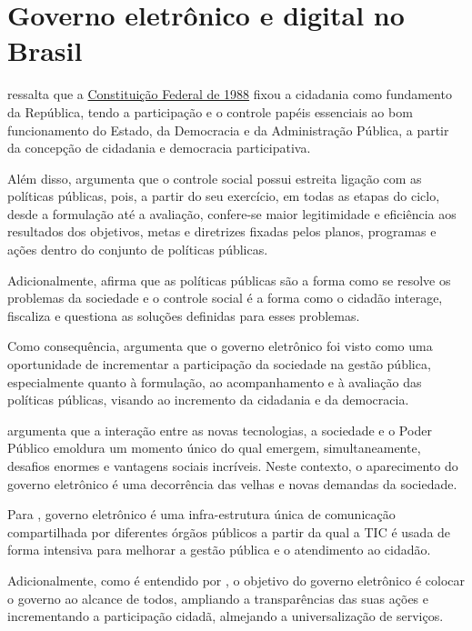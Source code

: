 \chapter{Governo eletrônico e digital no Brasil}

\cite{tavares2022governo} ressalta que a \href{https://www.planalto.gov.br/ccivil_03/constituicao/constituicao.htm}{Constituição Federal de 1988} fixou a cidadania como fundamento da República, tendo a participação e o controle papéis essenciais ao bom funcionamento do Estado, da Democracia e da Administração Pública, a partir da concepção de cidadania e democracia participativa.

Além disso, \cite{tavares2022governo} argumenta que o controle social possui estreita ligação com as políticas públicas, pois, a partir do seu exercício, em todas as etapas do ciclo, desde a formulação até a avaliação, confere-se maior legitimidade e eficiência aos resultados dos objetivos, metas e diretrizes fixadas pelos planos, programas e ações dentro do conjunto de políticas públicas.

Adicionalmente, \cite{tavares2022governo} afirma que as políticas públicas são a forma como se resolve os problemas da sociedade e o controle social é a forma como o cidadão interage, fiscaliza e questiona as soluções definidas para esses problemas. 

Como consequência, \cite{Guimaraes2005} argumenta que o governo eletrônico foi visto como uma oportunidade de incrementar a participação da sociedade na gestão pública, especialmente quanto à formulação, ao acompanhamento e à avaliação das políticas públicas, visando ao incremento da cidadania e da democracia. 

\cite{rover2009introduccao} argumenta que a interação entre as novas tecnologias, a sociedade e o Poder Público emoldura um momento único do qual emergem, simultaneamente, desafios enormes e vantagens sociais incríveis. Neste contexto, o aparecimento do governo eletrônico é uma decorrência das velhas e novas demandas da sociedade.

Para \cite{rover2009introduccao}, governo eletrônico é uma infra-estrutura única de comunicação compartilhada por diferentes órgãos públicos a partir da qual a TIC é usada de forma intensiva para melhorar a gestão pública e o atendimento ao cidadão.

Adicionalmente, como é entendido por \cite{rover2009introduccao}, o objetivo do governo eletrônico é colocar o governo ao alcance de todos, ampliando a transparências das suas ações e incrementando a participação cidadã, almejando a universalização de serviços.

